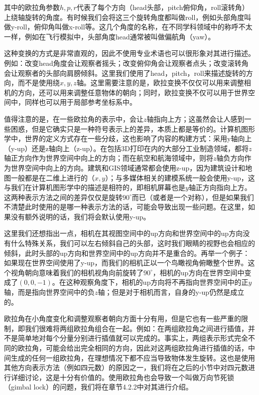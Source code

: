 \documentclass[
  paper=a4,
  ,captions=tableheading
]{scrartcl}
\begin{document}
其中的欧拉角参数\(h,p,r\)代表了每个方向（head头部，pitch俯仰角，roll滚转角）上绕轴旋转的角度。有时候我们会将这三个旋转角度都叫做roll，例如头部角度叫做y-roll，俯仰角叫做x-roll等。这几个角度的名称，在不同学科领域中的称呼不太一样，例如在飞行模拟中，头部角度head通常被叫做偏航角（yaw）。

这种变换的方式是非常直观的，因此不使用专业术语也可以很形象对其进行描述。例如：改变head角度会让观察者摇头；改变俯仰角会让观察者点头；改变滚转角会让观察者的头部向肩膀倾斜。这里我们使用了head，pitch，roll来描述旋转的方向，而不是使用绕\(x,y,z\)轴。这里需要注意的是，欧拉变换不仅仅可以用来调整相机的方向，还可以用来调整任意物体的朝向；同时，欧拉变换不仅可以用于世界空间中，同样也可以用于局部参考坐标系中。

值得注意的是，在一些欧拉角的表示中，会让\(z\)轴指向上方；这虽然会让人感到一些困惑，但是它确实只是一种符号表示上的差异，本质上都是等价的。计算机图形学中，世界的定义方式存在一些分歧，这也影响了内容的构建方式：采用y轴向上（y-up）还是z轴向上（z-up）。在包括3D打印在内的大部分工业制造领域，都将\(z\)轴正方向作为世界空间中向上的方向；而在航空和航海领域中，则将\(z\)轴负方向作为世界空间中向上的方向。建筑和GIS领域通常都会使用z-up，因为建筑设计和地图一般都是在二维上进行的（\(x,y\)）；与多媒体相关的建模系统一般会使用y-up，这与我们在计算机图形学中的描述是相符的，即相机屏幕也是\(y\)轴正方向指向上方。这两种表示方法之间的差异仅仅是旋转\(90^{\circ}\)而已（或者是一个对称），但是如果我们不清楚此时使用的是哪一种表示方法的话，可能会导致出现一些问题。在这里，如果没有额外说明的话，我们将会默认使用y-up。

这里我们还想指出一点，相机在其视图空间中的up方向和世界空间中的up方向没有什么特殊关系，我们可以左右倾斜自己的头部，这时我们眼睛的视野也会相应的倾斜，此时头部的up方向和世界空间中的up方向并不是重合的。再举一个例子：如果现在世界空间使用了y-up，而我们的相机正以一个鸟瞰视角俯瞰整个世界。这个视角朝向意味着我们的相机视角向前旋转了\(90^{\circ}\)，相机的up方向在世界空间中变成了\((0,0,-1)\)。在这种观察角度下，相机的up方向将不再指向世界空间中的正\(y\)轴，而是指向世界空间中的负\(z\)轴；但是对于相机而言，自身的y-up仍然是成立的。

欧拉角在小角度变化和调整观察者朝向方面十分有用，但是它也有一些严重的限制，即我们很难将两组欧拉角组合在一起。例如：在两组欧拉角之间进行插值，并不是简单地对每个分量分别进行插值就可以完成的。事实上，两组表示形式完全不同的欧拉角，可能会给出完全相同的方向，因此对这两组欧拉角进行插值的话，中间生成的任何一组欧拉角，在理想情况下都不应当导致物体发生旋转。这也是使用其他方向表示方法（例如四元数）的原因之一，我们将在之后的小节中对四元数进行详细讨论，这是十分有价值的。使用欧拉角也会导致一个叫做万向节死锁（gimbal
lock）的问题，我们将在章节4.2.2中对其进行介绍。
\end{document}
